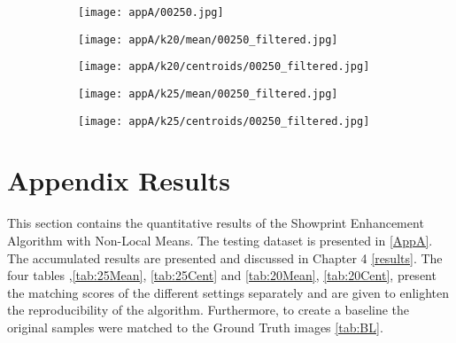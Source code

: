 \documentclass[draft,final]{vutinfth} %
\begin{document}
\begin{appendices}
\begin{figure}[h]
\centering
  \begin{subfigure}[t]{0.19\columnwidth}
    \centering
    \texttt{[image: appA/00250.jpg]}
  \end{subfigure}
  \begin{subfigure}[t]{0.19\columnwidth}
    \centering
    \texttt{[image: appA/k20/mean/00250\_filtered.jpg]}
  \end{subfigure}
  \begin{subfigure}[t]{0.19\columnwidth}
    \centering
    \texttt{[image: appA/k20/centroids/00250\_filtered.jpg]}
  \end{subfigure}
  \begin{subfigure}[t]{0.19\columnwidth}
    \centering
    \texttt{[image: appA/k25/mean/00250\_filtered.jpg]}
  \end{subfigure}
  \begin{subfigure}[t]{0.19\columnwidth}
    \centering
    \texttt{[image: appA/k25/centroids/00250\_filtered.jpg]}
  \end{subfigure}
\caption{}
\end{figure}  

\chapter{Appendix Results}
\label{AppB}
		This section contains the quantitative results of the Showprint Enhancement Algorithm with Non-Local Means.
		The testing dataset is presented in \ref{AppA}.
		The accumulated results are presented and discussed in Chapter 4 \ref{results}.
		The four tables ,\ref{tab:25Mean}, \ref{tab:25Cent} and \ref{tab:20Mean}, \ref{tab:20Cent}, present the matching scores of the different settings separately and are given to enlighten the reproducibility of the algorithm.
		Furthermore, to create a baseline the original samples were matched to the Ground Truth images \ref{tab:BL}.


\end{appendices}
\end{document}
